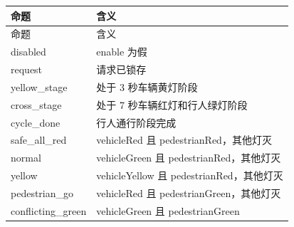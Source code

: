 \begin{longtable}{L{3.3cm}L{10.0cm}}

\toprule

命题 & 含义\\

\midrule

\endfirsthead

\toprule

命题 & 含义\\

\midrule

\endhead

{\ttfamily disabled} & enable 为假\\

{\ttfamily request} & 请求已锁存\\

{\ttfamily yellow\_stage} & 处于 3 秒车辆黄灯阶段\\

{\ttfamily cross\_stage} & 处于 7 秒车辆红灯和行人绿灯阶段\\

{\ttfamily cycle\_done} & 行人通行阶段完成\\

{\ttfamily safe\_all\_red} & vehicleRed 且 pedestrianRed，其他灯灭\\

{\ttfamily normal} & vehicleGreen 且 pedestrianRed，其他灯灭\\

{\ttfamily yellow} & vehicleYellow 且 pedestrianRed，其他灯灭\\

{\ttfamily pedestrian\_go} & vehicleRed 且 pedestrianGreen，其他灯灭\\

{\ttfamily conflicting\_green} & vehicleGreen 且 pedestrianGreen\\

\bottomrule

\end{longtable}

